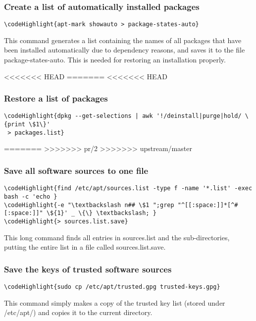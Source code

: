 \documentclass[12pt,a4paper]{article}
\begin{document}
\subsubsection{Create a list of automatically installed packages}
\begin{Verbatim}[commandchars=\\\{\}]
\codeHighlight{apt-mark showauto > package-states-auto}
\end{Verbatim}
This command generates a list containing the names of all packages that have been installed automatically due to dependency reasons, and saves it to the file package-states-auto.  This is needed for restoring an installation properly.

<<<<<<< HEAD
=======
<<<<<<< HEAD
\subsubsection{Restore a list of packages}
\begin{Verbatim}[commandchars=\\\{\}]
\codeHighlight{dpkg --get-selections | awk '!/deinstall|purge|hold/ \{print \$1\}'
 > packages.list}
\end{Verbatim}

=======
>>>>>>> pr/2
>>>>>>> upstream/master
\subsubsection{Save all software sources to one file}
\begin{Verbatim}[commandchars=\\\{\}]
\codeHighlight{find /etc/apt/sources.list -type f -name '*.list' -exec bash -c 'echo }
\codeHighlight{-e "\textbackslash n## \$1 ";grep "^[[:space:]]*[^#[:space:]]" \${1}' _ \{\} \textbackslash; }
\codeHighlight{> sources.list.save}
\end{Verbatim}
This long command finds all entries in sources.list and the sub-directories, putting the entire list in a file called sources.list.save.

\subsubsection{Save the keys of trusted software sources}
\begin{Verbatim}[commandchars=\\\{\}]
\codeHighlight{sudo cp /etc/apt/trusted.gpg trusted-keys.gpg}
\end{Verbatim}
This command simply makes a copy of the trusted key list (stored under /etc/apt/) and copies it to the current directory.
\end{document}

